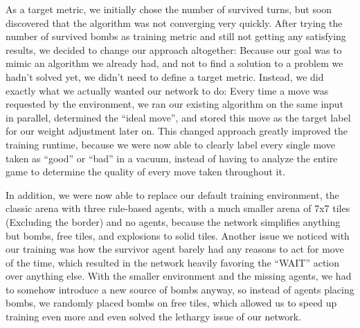As a target metric, we initially chose the number of survived turns, but soon discovered that the algorithm was not
converging very quickly.
After trying the number of survived bombs as training metric and still not getting any satisfying results, we decided to
change our approach altogether:
Because our goal was to mimic an algorithm we already had, and not to find a solution to a problem we hadn't solved yet,
we didn't need to define a target metric.
Instead, we did exactly what we actually wanted our network to do:
Every time a move was requested by the environment, we ran our existing algorithm on the same input in parallel,
determined the \enquote{ideal move}, and stored this move as the target label for our weight adjustment later on.
This changed approach greatly improved the training runtime, because we were now able to clearly label every single
move taken as \enquote{good} or \enquote{bad} in a vacuum, instead of having to analyze the entire game to determine the
quality of every move taken throughout it.

In addition, we were now able to replace our default training environment, the classic arena with three rule-based
agents, with a much smaller arena of 7x7 tiles (Excluding the border) and no agents, because the network simplifies
anything but bombs, free tiles, and explosions to solid tiles.
Another issue we noticed with our training was how the survivor agent barely had any reasons to act for move of the
time, which resulted in the network heavily favoring the \enquote{WAIT} action over anything else.
With the smaller environment and the missing agents, we had to somehow introduce a new source of bombs anyway, so
instead of agents placing bombs, we randomly placed bombs on free tiles, which allowed us to speed up training even more
and even solved the lethargy issue of our network.

